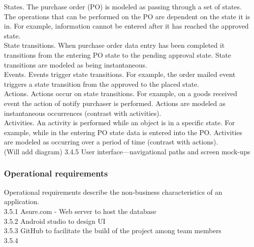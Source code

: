 \documentclass[12pt]{article}
\begin{document}
 	States. The purchase order (PO) is modeled as passing through a set of states. The operations that can be performed on the PO are dependent on the state it is in. For example, information cannot be entered after it has reached the approved state.\\
	State transitions. When purchase order data entry has been completed it transitions from the entering PO state to the pending approval state. State transitions are modeled as being instantaneous.\\
	Events. Events trigger state transitions. For example, the order mailed event triggers a state transition from the approved to the placed state.\\
	Actions. Actions occur on state transitions. For example, on a goods received event the action of notify purchaser is performed. Actions are modeled as instantaneous occurrences (contrast with activities).\\
	Activities. An activity is performed while an object is in a specific state. For example, while in the entering PO state data is entered into the PO. Activities are modeled as occurring over a period of time (contrast with actions).\\
	(Will add diagram)
3.4.5 User interface—navigational paths and screen mock-ups 
\subsubsection{Operational requirements}
Operational requirements describe the non-business characteristics of an application.\\
3.5.1 Asure.com - Web server to host the database\\ 
3.5.2 Android studio to design UI\\
3.5.3 GitHub to facilitate the build of the project among team members\\
3.5.4 

\end{document}
